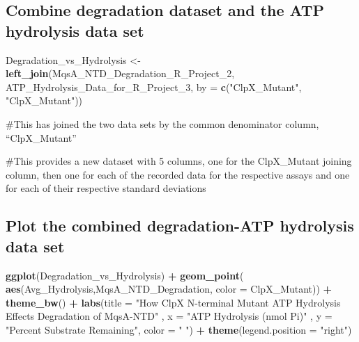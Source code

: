 \documentclass[]{article}
\newenvironment{Shaded}{\begin{snugshade}}{\end{snugshade}}
\newcommand{\DataTypeTok}[1]{\textcolor[rgb]{0.13,0.29,0.53}{#1}}
\newcommand{\DecValTok}[1]{\textcolor[rgb]{0.00,0.00,0.81}{#1}}
\newcommand{\KeywordTok}[1]{\textcolor[rgb]{0.13,0.29,0.53}{\textbf{#1}}}
\newcommand{\NormalTok}[1]{#1}
\newcommand{\OperatorTok}[1]{\textcolor[rgb]{0.81,0.36,0.00}{\textbf{#1}}}
\newcommand{\StringTok}[1]{\textcolor[rgb]{0.31,0.60,0.02}{#1}}
\begin{document}
\hypertarget{combine-degradation-dataset-and-the-atp-hydrolysis-data-set}{%
\subsection{Combine degradation dataset and the ATP hydrolysis data
set}\label{combine-degradation-dataset-and-the-atp-hydrolysis-data-set}}

\begin{Shaded}
\begin{Highlighting}[]
\NormalTok{Degradation_vs_Hydrolysis <-}\StringTok{ }\KeywordTok{left_join}\NormalTok{(MqsA_NTD_Degradation_R_Project_}\DecValTok{2}\NormalTok{, ATP_Hydrolysis_Data_for_R_Project_}\DecValTok{3}\NormalTok{,}
                                       \DataTypeTok{by =} \KeywordTok{c}\NormalTok{(}\StringTok{"ClpX_Mutant"}\NormalTok{, }\StringTok{"ClpX_Mutant"}\NormalTok{))}
\end{Highlighting}
\end{Shaded}

\#This has joined the two data sets by the common denominator column,
``ClpX\_Mutant''

\#This provides a new dataset with 5 columns, one for the ClpX\_Mutant
joining column, then one for each of the recorded data for the
respective assays and one for each of their respective standard
deviations

\hypertarget{plot-the-combined-degradation-atp-hydrolysis-data-set}{%
\subsection{Plot the combined degradation-ATP hydrolysis data
set}\label{plot-the-combined-degradation-atp-hydrolysis-data-set}}

\begin{Shaded}
\begin{Highlighting}[]
\KeywordTok{ggplot}\NormalTok{(Degradation_vs_Hydrolysis) }\OperatorTok{+}\StringTok{ }
\StringTok{  }\KeywordTok{geom_point}\NormalTok{( }\KeywordTok{aes}\NormalTok{(Avg_Hydrolysis,MqsA_NTD_Degradation, }\DataTypeTok{color =}\NormalTok{ ClpX_Mutant)) }\OperatorTok{+}
\StringTok{  }\KeywordTok{theme_bw}\NormalTok{() }\OperatorTok{+}\StringTok{ }
\StringTok{  }\KeywordTok{labs}\NormalTok{(}\DataTypeTok{title =} \StringTok{"How ClpX N-terminal Mutant ATP Hydrolysis Effects Degradation of MqsA-NTD"}\NormalTok{ , }
       \DataTypeTok{x =} \StringTok{"ATP Hydrolysis (nmol Pi)"}\NormalTok{ , }\DataTypeTok{y =} \StringTok{"Percent Substrate Remaining"}\NormalTok{, }\DataTypeTok{color =} \StringTok{" "}\NormalTok{) }\OperatorTok{+}
\StringTok{  }\KeywordTok{theme}\NormalTok{(}\DataTypeTok{legend.position =} \StringTok{"right"}\NormalTok{)}
\end{Highlighting}
\end{Shaded}
\end{document}
